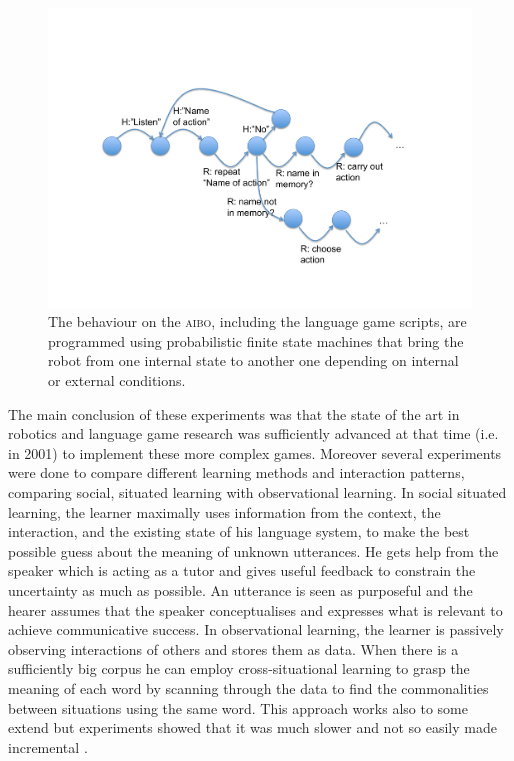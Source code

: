 \begin{figure}[htbp]
  \centerline{\includegraphics[width=.70\textwidth]{chap10/figs/fsm.pdf}}
\caption{\label{fig:fsm}The behaviour on the \textsc{aibo}, including the language game scripts, are programmed using probabilistic finite state 
machines that bring the robot from one internal state to another one depending on internal or external conditions.}
\end{figure}

The main conclusion of these experiments was that the state of the art in robotics and language
game research was sufficiently advanced at that time (i.e. in 
2001) to implement these more complex games. Moreover several experiments were done to compare
different learning methods and interaction patterns, comparing social, situated learning with 
observational learning. In social situated learning, 
the learner maximally uses information from the context, the 
interaction, and the existing state of his language system, to make the best possible guess about the meaning of 
unknown utterances. He gets help from the speaker which is acting as a tutor and gives useful feedback to constrain 
the uncertainty as much as possible. An utterance is seen as purposeful and the hearer assumes that the speaker conceptualises
and expresses what is relevant to achieve communicative success. In observational learning, the learner is 
passively observing interactions of others and stores them as data. When there is a sufficiently big 
corpus he can employ cross-situational learning to grasp the meaning of each word by scanning 
through the data to find the commonalities between 
situations using the same word. This approach works also to some extend but experiments showed that it was much slower and 
not so easily made incremental \citep{DeBeule:2006}. 

